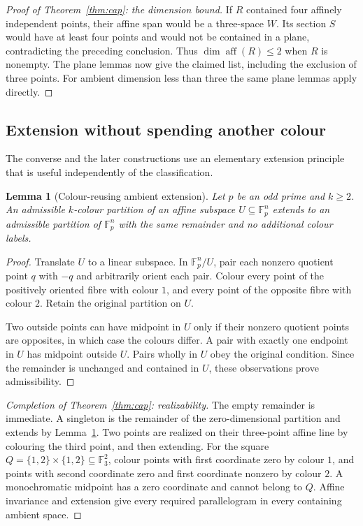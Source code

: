 \documentclass[11pt]{article}
\newtheorem{lemma}[theorem]{Lemma}
\theoremstyle{remark}
\newcommand{\F}{\mathbb F_3}
\newcommand{\Fp}{\mathbb F_p}
\newcommand{\aff}{\operatorname{aff}}
\begin{document}
\begin{proof}[Proof of Theorem~\ref{thm:cap}: the dimension bound]
If $R$ contained four affinely independent points, their affine span would
be a three-space $W$. Its section $S$ would have at least four points and
would not be contained in a plane, contradicting the preceding conclusion.
Thus $\dim\aff(R)\leq2$ when $R$ is nonempty. The plane lemmas now give
the claimed list, including the exclusion of three points. For ambient
dimension less than three the same plane lemmas apply directly.
\end{proof}

\subsection{Extension without spending another colour}

The converse and the later constructions use an elementary extension
principle that is useful independently of the classification.

\begin{lemma}[Colour-reusing ambient extension]\label{lem:extension}
Let $p$ be an odd prime and $k\geq2$. An admissible $k$-colour partition
of an affine subspace $U\subseteq\Fp^n$ extends to an admissible partition
of $\Fp^n$ with the same remainder and no additional colour labels.
\end{lemma}
\begin{proof}
Translate $U$ to a linear subspace. In $\Fp^n/U$, pair each nonzero quotient
point $q$ with $-q$ and arbitrarily orient each pair. Colour every point of
the positively oriented fibre with colour $1$, and every point of the
opposite fibre with colour $2$. Retain the original partition on $U$.

Two outside points can have midpoint in $U$ only if their nonzero quotient
points are opposites, in which case the colours differ. A pair with exactly
one endpoint in $U$ has midpoint outside $U$. Pairs wholly in $U$ obey the
original condition. Since the remainder is unchanged and contained in $U$,
these observations prove admissibility.
\end{proof}

\begin{proof}[Completion of Theorem~\ref{thm:cap}: realizability]
The empty remainder is immediate. A singleton is the remainder of the
zero-dimensional partition and extends by Lemma~\ref{lem:extension}.
Two points are realized on their three-point affine line by colouring the
third point, and then extending. For the square
$Q=\{1,2\}\times\{1,2\}\subseteq\F^2$, colour points with first coordinate
zero by colour $1$, and points with second coordinate zero and first
coordinate nonzero by colour $2$. A monochromatic midpoint has a zero
coordinate and cannot belong to $Q$. Affine invariance and extension give
every required parallelogram in every containing ambient space.
\end{proof}
\end{document}
